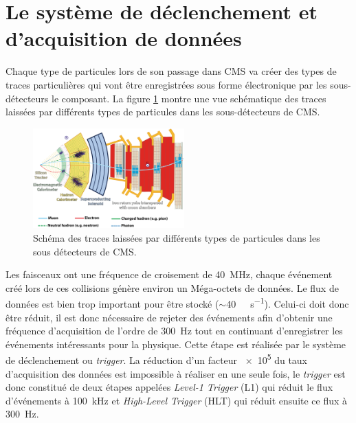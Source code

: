 \section{Le système de déclenchement et d'acquisition de données}
Chaque type de particules lors de son passage dans CMS va créer des types de traces particulières qui vont être enregistrées sous forme électronique par les sous-détecteurs le composant. La figure \ref{particules} montre une vue schématique des traces laissées par différents types de particules dans les sous-détecteurs de CMS.

	  \begin{figure}[ht!]
	\centering
	\includegraphics[width=0.52\textwidth]{CMS/particles.png}
	\captionsetup{type=figure}\caption{Schéma des traces laissées par différents types de particules dans les sous détecteurs de CMS.}
	\label{particules}
\end{figure}

Les faisceaux ont une fréquence de croisement de \SI{40}{\mega\hertz}, chaque événement créé lors de ces collisions génère environ un Méga-octets de données. Le flux de données est bien trop important pour être stocké ($\sim$\SI{40}{\tera\byte\per\second}). Celui-ci doit donc être réduit, il est donc nécessaire de rejeter des événements afin d'obtenir une fréquence d'acquisition de l'ordre de \SI{300}{\hertz} tout en continuant d'enregistrer les événements intéressants pour la physique. Cette étape est réalisée par le système de déclenchement ou \textit{trigger}. La réduction d'un facteur \num{e5} du taux d'acquisition des données est impossible à réaliser en une seule fois, le \textit{trigger} est donc constitué de deux étapes appelées \textit{Level-1 Trigger} (L1) qui réduit le flux d'événements à \SI{100}{\kilo\hertz} et \textit{High-Level Trigger} (HLT) qui réduit ensuite ce flux à \SI{300}{\hertz}.

